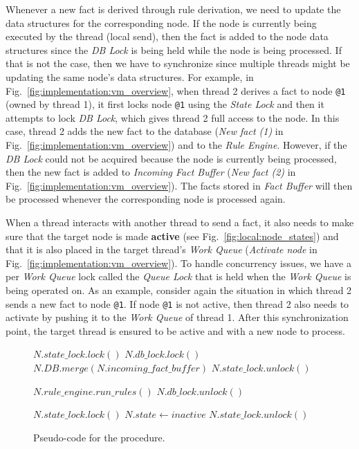 Whenever a new fact is derived through rule derivation, we need to update the
data structures for the corresponding node. If the node is currently being
executed by the thread (local send), then the fact is added to the node data
structures since the \emph{DB Lock} is being held while the node is being
processed. If that is not the case, then we have to synchronize since multiple
threads might be updating the same node's data structures. For example, in
Fig.~\ref{fig:implementation:vm_overview}, when thread 2 derives a fact to node
\texttt{@1} (owned by thread 1), it first locks node \texttt{@1} using the
\emph{State Lock} and then it attempts to lock \emph{DB Lock}, which gives thread
2 full access to the node. In this case, thread 2 adds the new fact to the
database (\emph{New fact (1)} in Fig.~\ref{fig:implementation:vm_overview}) and
to the \emph{Rule Engine}. However, if the \emph{DB Lock} could not be acquired
because the node  is currently being processed, then the new fact is
added to \emph{Incoming Fact Buffer} (\emph{New fact (2)} in
Fig.~\ref{fig:implementation:vm_overview}). The facts stored in \emph{Fact
Buffer} will then be processed whenever the corresponding node is processed
again.

When a thread interacts with another thread to send a fact, it also needs to
make sure that the target node is made \textbf{active} (see
Fig.~\ref{fig:local:node_states}) and that it is also placed in the target
thread's \emph{Work Queue} (\emph{Activate node} in
Fig.~\ref{fig:implementation:vm_overview}). To handle concurrency issues, we
have a per \emph{Work Queue} lock called the \emph{Queue Lock} that is held when
the \emph{Work Queue} is being operated on.  As an example, consider again the
situation in which thread 2 sends a new fact to node \texttt{@1}. If node
\texttt{@1} is not active, then thread 2 also needs to activate  by
pushing it to the \emph{Work Queue} of thread 1.  After this synchronization
point, the target thread is ensured to be active and with a new node to process.

\begin{figure}
\begin{algorithm}[H]
   $N.state\_lock.lock()$\;
   $N.db\_lock.lock()$\;
   $N.DB.merge(N.incoming\_fact\_buffer)$\;
   $N.state\_lock.unlock()$\;

   $N.rule\_engine.run\_rules()$\;
   $N.db\_lock.unlock()$\;

   $N.state\_lock.lock()$\;
   $N.state \longleftarrow inactive$\;
   $N.state\_lock.unlock()$\;
\end{algorithm}
\caption{Pseudo-code for the  procedure.}
 \label{alg:multicore:process_node}
\end{figure}

